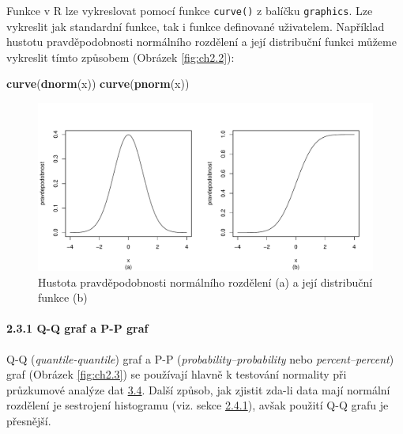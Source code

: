 \documentclass[12pt,]{article}
\newenvironment{Shaded}{\begin{snugshade}}{\end{snugshade}}
\newcommand{\KeywordTok}[1]{\textcolor[rgb]{0.13,0.29,0.53}{\textbf{#1}}}
\newcommand{\NormalTok}[1]{#1}
\let\oldparagraph\paragraph
\renewcommand{\paragraph}[1]{\oldparagraph{#1}\mbox{}}
\begin{document}
Funkce v R lze vykreslovat pomocí funkce \texttt{curve()} z balíčku
\texttt{graphics}. Lze vykreslit jak standardní funkce, tak i funkce
definované uživatelem. Například hustotu pravděpodobnosti normálního
rozdělení a její distribuční funkci můžeme vykreslit tímto způsobem
(Obrázek \ref{fig:ch2.2}):

\begin{Shaded}
\begin{Highlighting}[]
\KeywordTok{curve}\NormalTok{(}\KeywordTok{dnorm}\NormalTok{(x))}
\KeywordTok{curve}\NormalTok{(}\KeywordTok{pnorm}\NormalTok{(x))}
\end{Highlighting}
\end{Shaded}

\begin{figure}[H]

{\centering \includegraphics{BP_files/figure-latex/normal-1} 

}

\caption{\label{fig:ch2.2} Hustota pravděpodobnosti normálního rozdělení (a) a její distribuční funkce (b)}\label{fig:normal}
\end{figure}

\newpage

\hypertarget{qqpp}{\paragraph{2.3.1 Q-Q graf a P-P graf}\label{qqpp}}

\qquad Q-Q (\emph{quantile-quantile}) graf a P-P
(\emph{probability--probability} nebo \emph{percent--percent}) graf
(Obrázek \ref{fig:ch2.3}) se používají hlavně k testování normality při
průzkumové analýze dat \protect\hyperlink{normtests}{3.4}. Další způsob,
jak zjistit zda-li data mají normální rozdělení je sestrojení histogramu
(viz. sekce \protect\hyperlink{hist}{2.4.1}), avšak použití Q-Q grafu je
přesnější.
\end{document}
